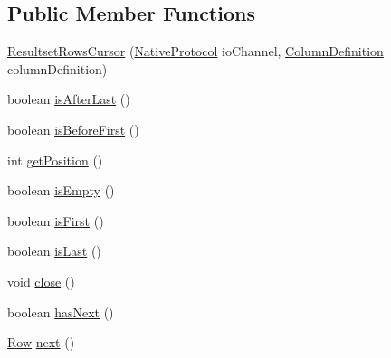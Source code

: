 \subsection*{Public Member Functions}
\begin{DoxyCompactItemize}
\item 
\mbox{\hyperlink{classcom_1_1mysql_1_1cj_1_1protocol_1_1a_1_1result_1_1_resultset_rows_cursor_a001b96f900d4ef21188c3cc2cf8275ec}{Resultset\+Rows\+Cursor}} (\mbox{\hyperlink{classcom_1_1mysql_1_1cj_1_1protocol_1_1a_1_1_native_protocol}{Native\+Protocol}} io\+Channel, \mbox{\hyperlink{interfacecom_1_1mysql_1_1cj_1_1protocol_1_1_column_definition}{Column\+Definition}} column\+Definition)
\item 
boolean \mbox{\hyperlink{classcom_1_1mysql_1_1cj_1_1protocol_1_1a_1_1result_1_1_resultset_rows_cursor_a26d45087615e0f6baa7a8b52d33a0ec4}{is\+After\+Last}} ()
\item 
boolean \mbox{\hyperlink{classcom_1_1mysql_1_1cj_1_1protocol_1_1a_1_1result_1_1_resultset_rows_cursor_a6ca4bec845f7589a9182c52c8f81e0c2}{is\+Before\+First}} ()
\item 
int \mbox{\hyperlink{classcom_1_1mysql_1_1cj_1_1protocol_1_1a_1_1result_1_1_resultset_rows_cursor_ab1ee40d0ad7227af904036a217b226e4}{get\+Position}} ()
\item 
boolean \mbox{\hyperlink{classcom_1_1mysql_1_1cj_1_1protocol_1_1a_1_1result_1_1_resultset_rows_cursor_a3fcb0eaca47918a78033b083af35b02a}{is\+Empty}} ()
\item 
boolean \mbox{\hyperlink{classcom_1_1mysql_1_1cj_1_1protocol_1_1a_1_1result_1_1_resultset_rows_cursor_a8d0ae8e04f7731f461437563ea13c6b9}{is\+First}} ()
\item 
boolean \mbox{\hyperlink{classcom_1_1mysql_1_1cj_1_1protocol_1_1a_1_1result_1_1_resultset_rows_cursor_ae16f7cc758e2518a8cf1c6acfddeed10}{is\+Last}} ()
\item 
void \mbox{\hyperlink{classcom_1_1mysql_1_1cj_1_1protocol_1_1a_1_1result_1_1_resultset_rows_cursor_a51a20849a2912a6869f24911f3334f76}{close}} ()
\item 
boolean \mbox{\hyperlink{classcom_1_1mysql_1_1cj_1_1protocol_1_1a_1_1result_1_1_resultset_rows_cursor_af056a90c47de13b8849cdd7ee7957835}{has\+Next}} ()
\item 
\mbox{\hyperlink{interfacecom_1_1mysql_1_1cj_1_1result_1_1_row}{Row}} \mbox{\hyperlink{classcom_1_1mysql_1_1cj_1_1protocol_1_1a_1_1result_1_1_resultset_rows_cursor_ad45163788fc1ede098e8e24203628ee1}{next}} ()
\item 

\end{DoxyCompactItemize}
